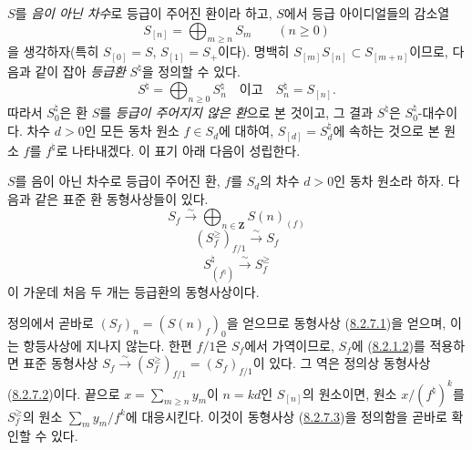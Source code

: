 \begin{env}[8.2.6]
\label{II.8.2.6-ko}
$S$를 \emph{음이 아닌 차수}로 등급이 주어진 환이라 하고, $S$에서
등급 아이디얼들의 감소열
\begin{equation}
\label{II.8.2.6.1-ko}
  S_{[n]}=\bigoplus_{m\geq n}S_m\qquad(n\geq0)
\tag{8.2.6.1}
\end{equation}
을 생각하자(특히 $S_{[0]}=S$, $S_{[1]}=S_+$이다). 명백히
$S_{[m]}S_{[n]}\subset S_{[m+n]}$이므로, 다음과 같이 잡아
\emph{등급환} $S^\natural$을 정의할 수 있다.
\begin{equation}
\label{II.8.2.6.2-ko}
  S^\natural=\bigoplus_{n\geq0}S_n^\natural
  \quad\text{이고}\quad S_n^\natural=S_{[n]}.
\tag{8.2.6.2}
\end{equation}
따라서 $S_0^\natural$은 환 $S$를 \emph{등급이 주어지지 않은 환}으로
본 것이고, 그 결과 $S^\natural$은 $S_0^\natural$-대수이다. 차수
$d>0$인 모든 동차 원소 $f\in S_d$에 대하여, $S_{[d]}=S_d^\natural$에
속하는 것으로 본 원소 $f$를 $f^\natural$로 나타내겠다. 이 표기 아래
다음이 성립한다.
\end{env}


\begin{lemma}[8.2.7]
\label{II.8.2.7-ko}
$S$를 음이 아닌 차수로 등급이 주어진 환, $f$를 $S_d$의 차수
$d>0$인 동차 원소라 하자. 다음과 같은 표준 환 동형사상들이 있다.
\begin{equation}
\label{II.8.2.7.1-ko}
  S_f\xrightarrow{\sim}\bigoplus_{n\in\mathbf{Z}}S(n)_{(f)}
\tag{8.2.7.1}
\end{equation}
\begin{equation}
\label{II.8.2.7.2-ko}
  (S_f^{\geq})_{f/1}\xrightarrow{\sim}S_f
\tag{8.2.7.2}
\end{equation}
\begin{equation}
\label{II.8.2.7.3-ko}
  S^\natural_{(f^\natural)}\xrightarrow{\sim}S_f^{\geq}
\tag{8.2.7.3}
\end{equation}
이 가운데 처음 두 개는 등급환의 동형사상이다.
\end{lemma}

정의에서 곧바로 $(S_f)_n=(S(n)_f)_0$을 얻으므로 동형사상
(\hyperref[II.8.2.7.1-ko]{8.2.7.1})을 얻으며, 이는 항등사상에 지나지
않는다. 한편 $f/1$은 $S_f$에서 가역이므로, $S_f$에
(\hyperref[II.8.2.1.2-ko]{8.2.1.2})를 적용하면 표준 동형사상
$S_f\xrightarrow{\sim}(S_f^{\geq})_{f/1}=(S_f)_{f/1}$이 있다. 그 역은
정의상 동형사상 (\hyperref[II.8.2.7.2-ko]{8.2.7.2})이다. 끝으로
$x=\sum_{m\geq n}y_m$이 $n=kd$인 $S_{[n]}$의 원소이면, 원소
$x/(f^\natural)^k$를 $S_f^{\geq}$의 원소
$\sum_m y_m/f^k$에 대응시킨다. 이것이 동형사상
(\hyperref[II.8.2.7.3-ko]{8.2.7.3})을 정의함을 곧바로 확인할 수 있다.

